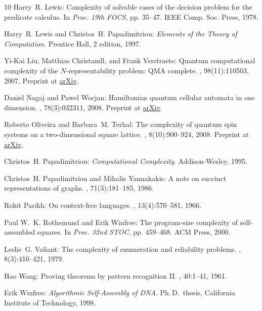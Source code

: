 \begin{thebibliography}{10}
{\sc Harry~R. Lewis}: Complexity of solvable cases of the decision problem for
  the predicate calculus.
\newblock In {\em Proc. 19th FOCS}, pp. 35--47. IEEE Comp. Soc. Press, 1978.

{\sc Harry~R. Lewis and Christos~H. Papadimitriou}: {\em Elements of the Theory
  of Computation}.
\newblock Prentice Hall, 2 edition, 1997.

{\sc Yi-Kai Liu, Matthias Christandl, and Frank Verstraete}: Quantum
  computational complexity of the {$N$}-representability problem: {Q}{M}{A}
  complete.
, 98(11):110503, 2007.
\newblock Preprint at \href{http://arxiv.org/abs/quant-ph/0609125}{arXiv}.

{\sc Daniel Nagaj and Pawel Wocjan}: Hamiltonian quantum cellular automata in
  one dimension.
, 78(3):032311, 2008.
\newblock Preprint at \href{http://arxiv.org/abs/0802.0886}{arXiv}.

{\sc Roberto Oliveira and Barbara~M. Terhal}: The complexity of quantum spin
  systems on a two-dimensional square lattice.
, 8(10):900--924, 2008.
\newblock Preprint at \href{http://arxiv.org/abs/quant-ph/0504050}{arXiv}.

{\sc Christos~H. Papadimitriou}: {\em Computational Complexity}.
\newblock Addison-Wesley, 1995.

{\sc Christos~H. Papadimitriou and Mihalis Yannakakis}: A note on succinct
  representations of graphs.
, 71(3):181--185, 1986.
\newblock [\epfmtdoi{10.1016/S0019-9958(86)80009-2}]

{\sc Rohit Parikh}: On context-free languages.
, 13(4):570--581, 1966.
\newblock [\epfmtdoi{10.1145/321356.321364}]

{\sc Paul W.~K. Rothemund and Erik Winfree}: The program-size complexity of
  self-assembled squares.
\newblock In {\em Proc. 32nd STOC}, pp. 459--468. ACM Press, 2000.
\newblock [\epfmtdoi{10.1145/335305.335358}]

{\sc Leslie~G. Valiant}: The complexity of enumeration and reliability
  problems.
, 8(3):410--421, 1979.
\newblock [\epfmtdoi{10.1137/0208032}]

{\sc Hao Wang}: Proving theorems by pattern recognition {II}.
, 40:1--41, 1961.

{\sc Erik Winfree}: {\em Algorithmic Self-Assembly of DNA}.
\newblock Ph.\,D.\ thesis, California Institute of Technology, 1998.

\end{thebibliography}
